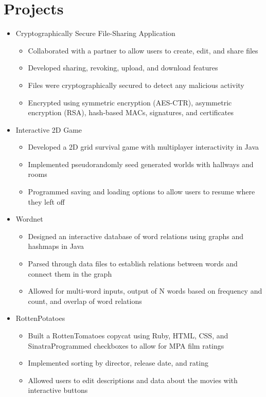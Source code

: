 \documentclass[letterpaper,11pt]{article}
\newcommand{\resumeItemListStart}{\begin{itemize}}
\newcommand{\resumeItemListEnd}{\end{itemize}\vspace{-5pt}}
\begin{document}
\section{Projects}
    \begin{itemize}
      \setlength\itemsep{0em}
      \item {Cryptographically Secure File-Sharing Application}
      \resumeItemListStart
        \setlength\itemsep{-0.25em}
        \item {Collaborated with a partner to allow users to create, edit, and share files}
        \item {Developed sharing, revoking, upload, and download features}
        \item {Files were cryptographically secured to detect any malicious activity}
        \item {Encrypted using symmetric encryption (AES-CTR), asymmetric encryption (RSA), hash-based MACs, signatures, and certificates}
      \resumeItemListEnd
    \end{itemize}
    \vspace{5pt}
    \begin{itemize}
        \item {Interactive 2D Game}
        \resumeItemListStart
            \item {Developed a 2D grid survival game with multiplayer interactivity in Java}
            \item {Implemented pseudorandomly seed generated worlds with hallways and rooms}
            \item {Programmed saving and loading options to allow users to resume where they left off}
      \resumeItemListEnd
    \end{itemize}
    \vspace{5pt}
    \begin{itemize}
        \item {Wordnet}
        \resumeItemListStart
            \item {Designed an interactive database of word relations using graphs and hashmaps in Java}
            \item {Parsed through data files to establish relations between words and connect them in the graph}
            \item {Allowed for multi-word inputs, output of N words based on frequency and count, and overlap of word relations}
      \resumeItemListEnd
    \end{itemize}
    \vspace{5pt}
    \begin{itemize}
        \item {RottenPotatoes}
        \resumeItemListStart
            \item {Built a RottenTomatoes copycat using Ruby, HTML, CSS, and SinatraProgrammed checkboxes to allow for MPA film ratings}
            \item {Implemented sorting by director, release date, and rating}
            \item {Allowed users to edit descriptions and data about the movies with interactive buttons}
      \resumeItemListEnd
    \end{itemize}
      
\end{document}
